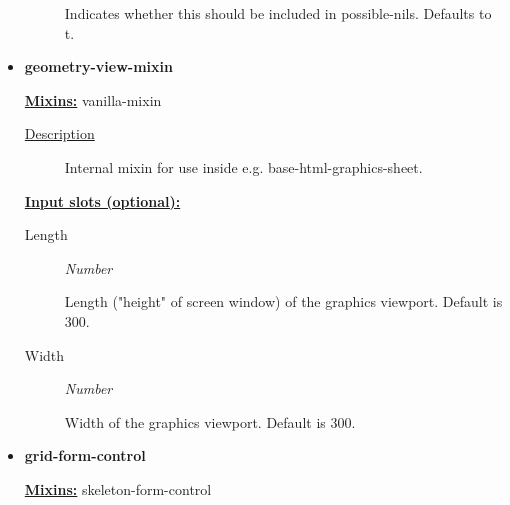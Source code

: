 \documentclass [11pt]{book}
\begin{document}
\begin{itemize}
\begin{description}
 Indicates whether this should be included in possible-nils. Defaults to t.




\end{description}







\item {}
\label{prim:geometry-view-mixin}
\textbf{geometry-view-mixin}


\textbf{
\underline{Mixins:}} vanilla-mixin





\begin{description}

\item [
\underline{Description}]


Internal mixin for use inside e.g. base-html-graphics-sheet.



\end{description}








\textbf{
\underline{Input slots (optional):}}

\begin{description}

\item [Length]
\emph{Number}

 Length ("height" of screen window) of the graphics viewport. Default is 300.




\item [Width]
\emph{Number}

 Width of the graphics viewport. Default is 300.




\end{description}







\item {}
\label{prim:grid-form-control}
\textbf{grid-form-control}


\textbf{
\underline{Mixins:}} skeleton-form-control






\end{itemize}
\end{document}
